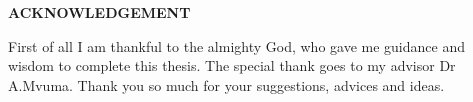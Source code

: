 \begin{center}
{\large \textbf{ACKNOWLEDGEMENT}} \\
\vspace{1in}
\end{center}
First of all I am thankful to the almighty God, who gave me guidance and wisdom to complete this thesis. The special thank goes to my advisor Dr A.Mvuma. Thank you so much for your suggestions, advices and ideas.
\newpage